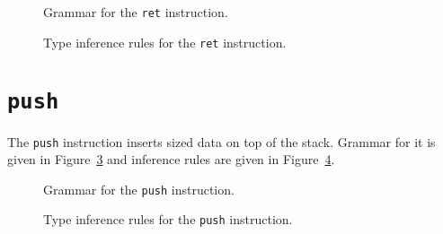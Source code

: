 \begin{figure}[H]
  \centering


  \caption{Grammar for the \texttt{ret} instruction.}
  \label{fig:nstar-instructionset-ret-grammar}
\end{figure}

\begin{figure}[H]
  \centering

  \begin{prooftree}
  \end{prooftree}

  \caption{Type inference rules for the \texttt{ret} instruction.}
  \label{fig:nstar-instructionset-ret-typerules}
\end{figure}

\section{\texttt{push}}\label{sec:nstar-instructionset-push}

The \texttt{push} instruction inserts sized data on top of the stack.
Grammar for it is given in Figure~\ref{fig:nstar-instructionset-push-grammar} and inference rules are given in Figure~\ref{fig:nstar-instructionset-push-typerules}.

\begin{figure}[H]
  \centering


  \caption{Grammar for the \texttt{push} instruction.}
  \label{fig:nstar-instructionset-push-grammar}
\end{figure}

\begin{figure}[H]
  \centering

  \begin{prooftree}
  \end{prooftree}

  \caption{Type inference rules for the \texttt{push} instruction.}
  \label{fig:nstar-instructionset-push-typerules}
\end{figure}

